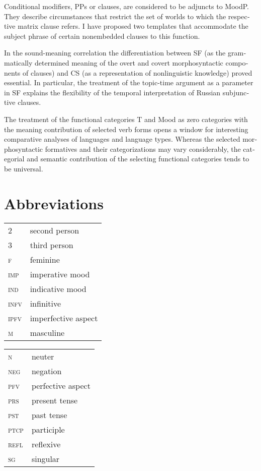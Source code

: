 \documentclass[output=paper,colorlinks,citecolor=brown]{langscibook}
\begin{document}
\begin{otherlanguage}{english}
Conditional modifiers, PPs or clauses, are considered to be adjuncts to MoodP. They describe circumstances that restrict the set of worlds to which the respective matrix clause refers. I have proposed two templates that accommodate the subject phrase of certain nonembedded clauses to this function.

In the sound-meaning correlation the differentiation between SF (as 
the grammatically determined meaning of the overt and covert morphosyntactic components of clauses) and CS (as a representation of nonlinguistic knowledge) proved essential. In particular, the treatment of the 
topic-time argument as a parameter in SF explains the flexibility of the temporal interpretation of Russian 
subjunctive clauses.

The treatment of the functional categories T and Mood as zero categories with the meaning contribution of selected verb forms opens a window for interesting comparative analyses of languages and language types. Whereas the selected morphosyntactic formatives and their categorizations may vary considerably, the categorial and semantic contribution of the selecting functional categories tends to be universal.

\section*{Abbreviations}

\begin{tabularx}{.45\textwidth}{@{}lQ}
2 & second person \\
3 & third person \\
\textsc{f} & feminine \\
\textsc{imp} & imperative mood \\
\textsc{ind} & indicative mood \\
\textsc{infv} & infinitive \\
\textsc{ipfv} & imperfective aspect \\
\textsc{m} & masculine \\
\end{tabularx}
\begin{tabularx}{.45\textwidth}{lQ@{}}
\textsc{n} & neuter \\
\textsc{neg} & negation \\
\textsc{pfv} & perfective aspect \\
\textsc{prs} & present tense \\
\textsc{pst} & past tense \\
\textsc{ptcp} & participle \\
\textsc{refl} & reflexive \\
\textsc{sg} & singular \\
\end{tabularx}


\end{otherlanguage}
\end{document}
